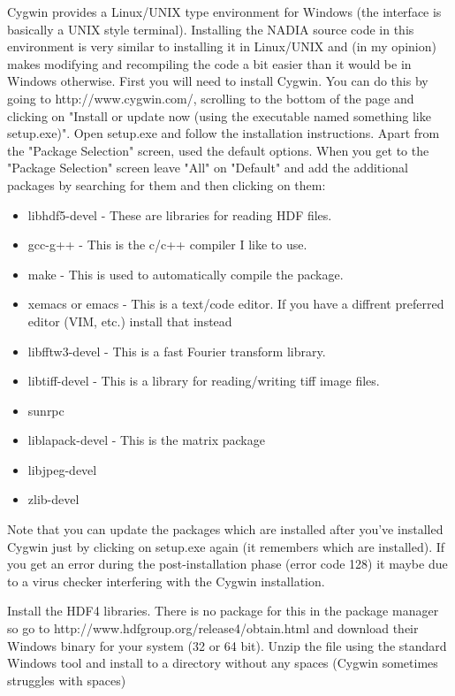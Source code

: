 \documentclass[]{nadia}
\begin{document}
Cygwin\cite{cygwin} provides a Linux/UNIX type environment for Windows (the
interface is basically a UNIX style terminal). Installing the NADIA
source code in this environment is very similar to installing it in
Linux/UNIX and (in my opinion) makes modifying and recompiling the
code a bit easier than it would be in Windows otherwise. First you
will need to install Cygwin. You can do this by going to
http://www.cygwin.com/, scrolling to the bottom of the page and
clicking on "Install or update now (using the executable named something like setup.exe)". Open setup.exe
and follow the installation instructions. Apart from the "Package
Selection" screen, used the default options. When you get to the
"Package Selection" screen leave "All" on "Default" and add the
additional packages by searching for them and then clicking on them:
\begin{itemize}
\item libhdf5-devel - These are libraries for reading HDF files.
\item gcc-g++ - This is the c/c++ compiler I like to use.
\item make - This is used to automatically compile the package.
\item xemacs or emacs - This is a text/code editor. If you have a diffrent preferred editor (VIM, etc.) install that instead
\item libfftw3-devel - This is a fast Fourier transform library.
\item libtiff-devel - This is a library for reading/writing tiff image files.
\item sunrpc
\item liblapack-devel - This is the matrix package
\item libjpeg-devel
\item zlib-devel
\end{itemize}

Note that you can update the packages which are installed after you've
installed Cygwin just by clicking on setup.exe again (it remembers
which are installed). If you get an error during the post-installation
phase (error code 128) it maybe due to a virus checker interfering
with the Cygwin installation.

Install the HDF4 libraries. There is no package for this in the
package manager so go to http://www.hdfgroup.org/release4/obtain.html
and download their Windows binary for your system (32 or 64 bit). 
Unzip the file using the standard Windows tool and install to a directory 
without any spaces (Cygwin sometimes struggles with spaces)
\end{document}
